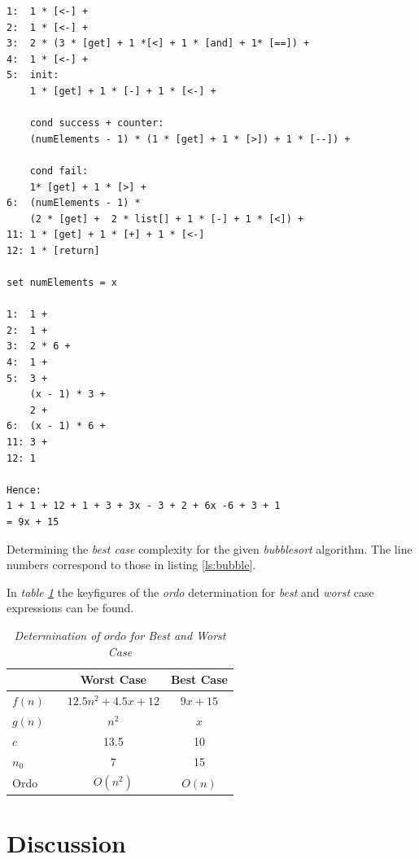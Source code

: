 \documentclass[a4paper,11pt,twoside]{article}
\begin{document}
\begin{listing}
\begin{verbatim}
1:  1 * [<-] +
2:  1 * [<-] +
3:  2 * (3 * [get] + 1 *[<] + 1 * [and] + 1* [==]) +
4:  1 * [<-] +
5:  init:
    1 * [get] + 1 * [-] + 1 * [<-] +

    cond success + counter:
    (numElements - 1) * (1 * [get] + 1 * [>]) + 1 * [--]) +
    
    cond fail:
    1* [get] + 1 * [>] + 
6:  (numElements - 1) * 
    (2 * [get] +  2 * list[] + 1 * [-] + 1 * [<]) +
11: 1 * [get] + 1 * [+] + 1 * [<-]
12: 1 * [return]

set numElements = x

1:  1 +
2:  1 +
3:  2 * 6 +
4:  1 +
5:  3 + 
    (x - 1) * 3 +
    2 +
6:  (x - 1) * 6 +
11: 3 +
12: 1 

Hence:
1 + 1 + 12 + 1 + 3 + 3x - 3 + 2 + 6x -6 + 3 + 1
= 9x + 15

\end{verbatim}
\caption{Determining the \emph{best case} complexity for the given
  \emph{bubblesort} algorithm. The line numbers correspond to those in
  listing \ref{ls:bubble}.\label{ls:best}}
\end{listing}

In \textit{table \ref{tab:ordo2}} the keyfigures of the \emph{ordo} determination for
\emph{best} and \emph{worst} case expressions can be found. 

\begin{table}[]
\caption{\textit{Determination of $ordo$ for \emph{Best} and \emph{Worst Case}}}
\label{tab:ordo2}
\begin{tabular}{llcc}
&  & Worst Case & Best Case \\ 
\hline
$f(n)$ &  & \multicolumn{1}{c}{$12.5n^2+4.5x+12$} & \multicolumn{1}{c}{$9x+15$} \\
$g(n)$ &  & $n^2$                                 & $x$   \\
$c$    &  & 13.5                                  & 10                          \\
$n_0$  &  & 7                                     & 15        \\
Ordo   &  & $O(n^2)$                              & $O(n)$ \\
\end{tabular}
\end{table}

\section{Discussion}
\end{document}
